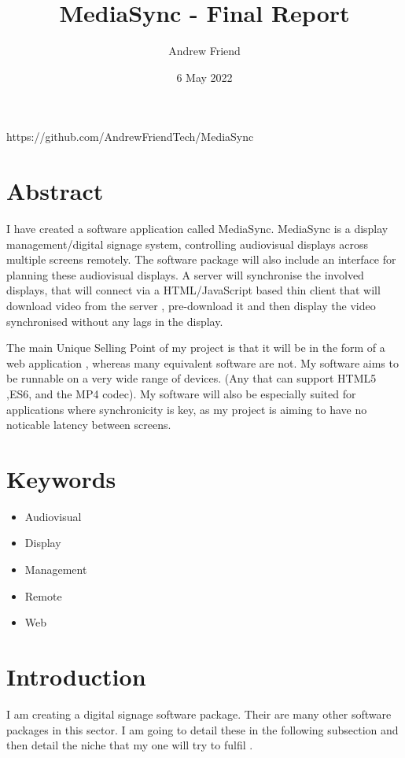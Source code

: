 \documentclass{article}
\title{MediaSync - Final Report}
\author{Andrew Friend}
\date{6 May 2022}
\begin{document}
\newcommand{\screenshotwidth}[0]{40em}

\maketitle
https://github.com/AndrewFriendTech/MediaSync
\newpage

\tableofcontents

\newpage

\section{Abstract}
I have created a software application called MediaSync. MediaSync is a display management/digital signage system, controlling audiovisual displays across multiple screens remotely. The software package will also include an interface for planning these audiovisual displays. A server will synchronise the involved displays, that will connect via a HTML/JavaScript based thin client that will download video from the server , pre-download it and then display the video synchronised without any lags in the display. 

The main Unique Selling Point of my project is that it will be in the form of a web application , whereas many equivalent software are not. My software aims to be runnable on a very wide range of devices. (Any that can support HTML5 ,ES6, and the MP4 codec). My software will also be especially suited for applications where synchronicity is key, as my project is aiming to have no noticable latency between screens.


\section{Keywords}
\begin{itemize}
\item Audiovisual
\item Display
\item Management
\item Remote
\item Web
\end{itemize}


\section{Introduction}

I am creating a digital signage software package. Their are many other software packages in this sector. I am going to detail these in the following subsection and then detail the niche that my one will try to fulfil
.
\end{document}

